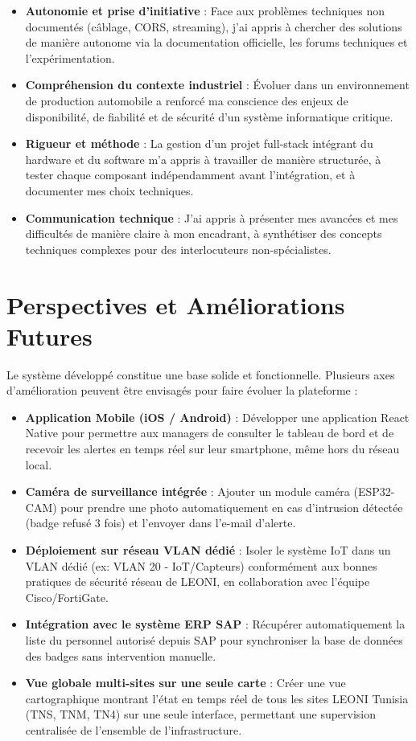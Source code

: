 \documentclass[12pt,a4paper]{report}
\begin{document}
\begin{itemize}
    \item \textbf{Autonomie et prise d'initiative} : Face aux problèmes techniques non documentés (câblage, CORS, streaming), j'ai appris à chercher des solutions de manière autonome via la documentation officielle, les forums techniques et l'expérimentation.
    \item \textbf{Compréhension du contexte industriel} : Évoluer dans un environnement de production automobile a renforcé ma conscience des enjeux de disponibilité, de fiabilité et de sécurité d'un système informatique critique.
    \item \textbf{Rigueur et méthode} : La gestion d'un projet full-stack intégrant du hardware et du software m'a appris à travailler de manière structurée, à tester chaque composant indépendamment avant l'intégration, et à documenter mes choix techniques.
    \item \textbf{Communication technique} : J'ai appris à présenter mes avancées et mes difficultés de manière claire à mon encadrant, à synthétiser des concepts techniques complexes pour des interlocuteurs non-spécialistes.
\end{itemize}

\section{Perspectives et Améliorations Futures}
Le système développé constitue une base solide et fonctionnelle. Plusieurs axes d'amélioration peuvent être envisagés pour faire évoluer la plateforme :

\begin{itemize}
    \item \textbf{Application Mobile (iOS / Android)} : Développer une application React Native pour permettre aux managers de consulter le tableau de bord et de recevoir les alertes en temps réel sur leur smartphone, même hors du réseau local.
    \item \textbf{Caméra de surveillance intégrée} : Ajouter un module caméra (ESP32-CAM) pour prendre une photo automatiquement en cas d'intrusion détectée (badge refusé 3 fois) et l'envoyer dans l'e-mail d'alerte.
    \item \textbf{Déploiement sur réseau VLAN dédié} : Isoler le système IoT dans un VLAN dédié (ex: VLAN 20 - IoT/Capteurs) conformément aux bonnes pratiques de sécurité réseau de LEONI, en collaboration avec l'équipe Cisco/FortiGate.
    \item \textbf{Intégration avec le système ERP SAP} : Récupérer automatiquement la liste du personnel autorisé depuis SAP pour synchroniser la base de données des badges sans intervention manuelle.
    \item \textbf{Vue globale multi-sites sur une seule carte} : Créer une vue cartographique montrant l'état en temps réel de tous les sites LEONI Tunisia (TNS, TNM, TN4) sur une seule interface, permettant une supervision centralisée de l'ensemble de l'infrastructure.
\end{itemize}
\end{document}
